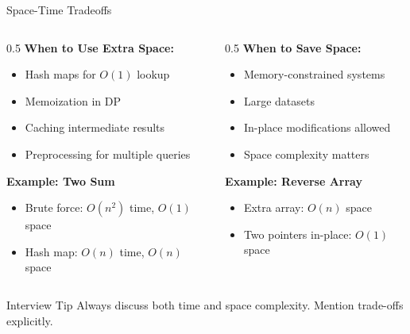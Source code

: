 \documentclass[aspectratio=169,xcolor=dvipsnames]{beamer}
\begin{document}
\begin{frame}{Space-Time Tradeoffs}
  \begin{columns}
    \begin{column}{0.5\textwidth}
      \textbf{When to Use Extra Space:}
      \begin{itemize}
        \item Hash maps for $O(1)$ lookup
        \item Memoization in DP
        \item Caching intermediate results
        \item Preprocessing for multiple queries
      \end{itemize}

      \vspace{0.3cm}
      \textbf{Example: Two Sum}
      \begin{itemize}
        \item Brute force: $O(n^2)$ time, $O(1)$ space
        \item Hash map: $O(n)$ time, $O(n)$ space
      \end{itemize}
    \end{column}

    \begin{column}{0.5\textwidth}
      \textbf{When to Save Space:}
      \begin{itemize}
        \item Memory-constrained systems
        \item Large datasets
        \item In-place modifications allowed
        \item Space complexity matters
      \end{itemize}

      \vspace{0.3cm}
      \textbf{Example: Reverse Array}
      \begin{itemize}
        \item Extra array: $O(n)$ space
        \item Two pointers in-place: $O(1)$ space
      \end{itemize}
    \end{column}
  \end{columns}

  \vspace{0.3cm}
  \begin{block}{Interview Tip}
    Always discuss both time and space complexity. Mention trade-offs explicitly.
  \end{block}
\end{frame}
\end{document}
